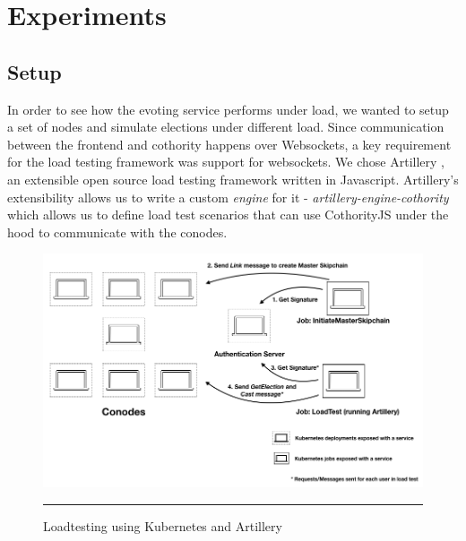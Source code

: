 
\chapter{Experiments} %

\label{Chapter4} %


\section{Setup}

In order to see how the evoting service performs under load, we wanted to setup a set of nodes and simulate elections under different load. Since communication between the frontend and cothority happens over Websockets, a key requirement for the load testing framework was support for websockets. We chose Artillery \cite{artillery}, an extensible open source load testing framework written in Javascript. Artillery's extensibility allows us to write a custom \textit{engine} for it - \textit{artillery-engine-cothority} \cite{artillery-engine-cothority} which allows us to define load test scenarios that can use CothorityJS under the hood to communicate with the conodes.

\begin{figure}[htpb]
  \centering
    \includegraphics[scale=0.4]{Figures/Kubernetes.png}
    \rule{35em}{0.5pt}
  \caption[Loadtesting]{Loadtesting using Kubernetes and Artillery}
  \label{fig:Loadtesting}
\end{figure}


